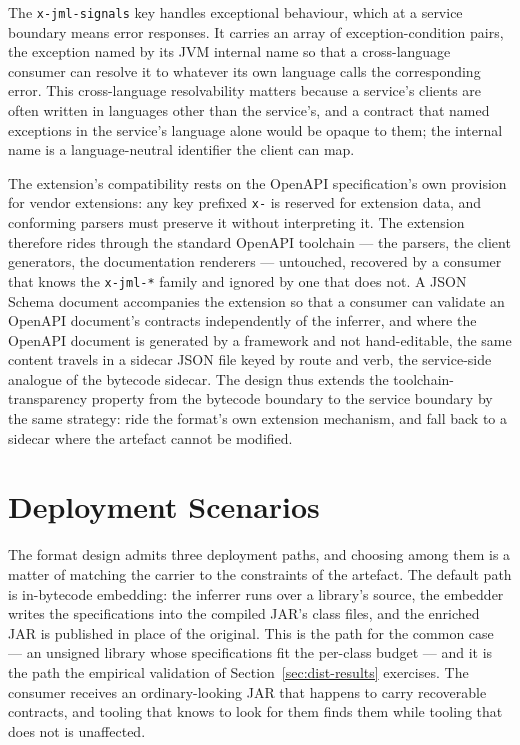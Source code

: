The \texttt{x-jml-signals} key handles exceptional behaviour, which at a service
boundary means error responses. It carries an array of exception-condition pairs,
the exception named by its JVM internal name so that a cross-language consumer can
resolve it to whatever its own language calls the corresponding error. This
cross-language resolvability matters because a service's clients are often written
in languages other than the service's, and a contract that named exceptions in the
service's language alone would be opaque to them; the internal name is a
language-neutral identifier the client can map.

The extension's compatibility rests on the OpenAPI specification's own provision
for vendor extensions: any key prefixed \texttt{x-} is reserved for extension data,
and conforming parsers must preserve it without interpreting it. The extension
therefore rides through the standard OpenAPI toolchain --- the parsers, the client
generators, the documentation renderers --- untouched, recovered by a consumer that
knows the \texttt{x-jml-*} family and ignored by one that does not. A JSON Schema
document accompanies the extension so that a consumer can validate an OpenAPI
document's contracts independently of the inferrer, and where the OpenAPI document
is generated by a framework and not hand-editable, the same content travels in a
sidecar JSON file keyed by route and verb, the service-side analogue of the bytecode
sidecar. The design thus extends the toolchain-transparency property from the
bytecode boundary to the service boundary by the same strategy: ride the format's
own extension mechanism, and fall back to a sidecar where the artefact cannot be
modified.

\section{Deployment Scenarios}
\label{sec:dist-scenarios}

The format design admits three deployment paths, and choosing among them is a
matter of matching the carrier to the constraints of the artefact. The default
path is in-bytecode embedding: the inferrer runs over a library's source, the
embedder writes the specifications into the compiled JAR's class files, and the
enriched JAR is published in place of the original. This is the path for the
common case --- an unsigned library whose specifications fit the per-class budget
--- and it is the path the empirical validation of Section~\ref{sec:dist-results}
exercises. The consumer receives an ordinary-looking JAR that happens to carry
recoverable contracts, and tooling that knows to look for them finds them while
tooling that does not is unaffected.

